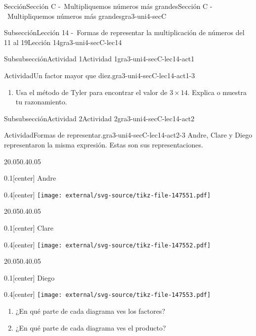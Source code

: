 \documentclass[twoside,10pt,]{article}
\begin{document}
\begin{sectionptx}{Sección}{Sección C -~Multipliquemos números más grandes}{}{Sección C -~Multipliquemos números más grandes}{}{}{gra3-uni4-secC}
\begin{subsectionptx}{Subsección}{Lección 14 -~Formas de representar la multiplicación de números del 11 al 19}{}{Lección 14}{}{}{gra3-uni4-secC-lec14}
\begin{subsubsectionptx}{Subsubsección}{Actividad 1}{}{Actividad 1}{}{}{gra3-uni4-secC-lec14-act1}
\begin{activity}{Actividad}{Un factor mayor que diez.}{gra3-uni4-secC-lec14-act1-3}
\begin{enumerate}
\begin{sidebyside}{2}{0}{0.05}{0.05}
\begin{sbspanel}{0.4}
\end{sbspanel}%
\end{sidebyside}%
\item{}Usa el método de Tyler para encontrar el valor de  \(3\times 14\). Explica o muestra tu razonamiento.%
\end{enumerate}
\end{activity}%
\end{subsubsectionptx}
%
%
\typeout{************************************************}
\typeout{************************************************}
%
\begin{subsubsectionptx}{Subsubsección}{Actividad 2}{}{Actividad 2}{}{}{gra3-uni4-secC-lec14-act2}
\begin{activity}{Actividad}{Formas de representar.}{gra3-uni4-secC-lec14-act2-3}%
Andre, Clare y Diego representaron la misma expresión. Estas son sus representaciones.%
\begin{sidebyside}{2}{0.05}{0.4}{0.05}%
\begin{sbspanel}{0.1}[center]%
Andre%
\end{sbspanel}%
\begin{sbspanel}{0.4}[center]%
\texttt{[image: external/svg-source/tikz-file-147551.pdf]}
\end{sbspanel}%
\end{sidebyside}%
\begin{sidebyside}{2}{0.05}{0.4}{0.05}%
\begin{sbspanel}{0.1}[center]%
Clare%
\end{sbspanel}%
\begin{sbspanel}{0.4}[center]%
\texttt{[image: external/svg-source/tikz-file-147552.pdf]}
\end{sbspanel}%
\end{sidebyside}%
\begin{sidebyside}{2}{0.05}{0.4}{0.05}%
\begin{sbspanel}{0.1}[center]%
Diego%
\end{sbspanel}%
\begin{sbspanel}{0.4}[center]%
\texttt{[image: external/svg-source/tikz-file-147553.pdf]}
\end{sbspanel}%
\end{sidebyside}%
%
\begin{enumerate}
\item{}¿En qué parte de cada diagrama ves los factores?%
\item{}¿En qué parte de cada diagrama ves el producto?%

\end{enumerate}
\end{activity}
\end{subsubsectionptx}
\end{subsectionptx}
\end{sectionptx}
\end{document}
